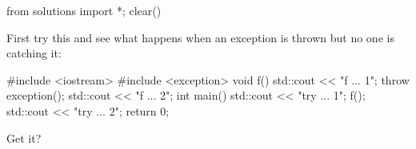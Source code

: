 \begin{python0}
from solutions import *; clear()
\end{python0}

First try this and see what happens when an exception is thrown but no
one is catching it:
\begin{console}
#include <iostream>
#include <exception>
void f()
{    
     std::cout << "f ... 1\n";
     throw exception();
     std::cout << "f ... 2\n";
}
int main()
{   
    std::cout << "try ... 1\n";
    f();
    std::cout << "try ... 2\n";
    return 0;
}
\end{console}

Get it?

